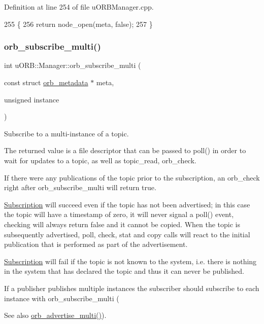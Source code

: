 Definition at line 254 of file u\+O\+R\+B\+Manager.\+cpp.


\begin{DoxyCode}
255 \{
256     \textcolor{keywordflow}{return} node\_open(meta, \textcolor{keyword}{false});
257 \}
\end{DoxyCode}
\mbox{\label{classuORB_1_1Manager_a9a31fb71a0962db44450963559296cfe}} 
\subsubsection{\texorpdfstring{orb\+\_\+subscribe\+\_\+multi()}{orb\_subscribe\_multi()}}
{\footnotesize\ttfamily int u\+O\+R\+B\+::\+Manager\+::orb\+\_\+subscribe\+\_\+multi (\begin{DoxyParamCaption}\item[{const struct \hyperlink{structorb__metadata}{orb\+\_\+metadata} $\ast$}]{meta,  }\item[{unsigned}]{instance }\end{DoxyParamCaption})}

Subscribe to a multi-\/instance of a topic.

The returned value is a file descriptor that can be passed to poll() in order to wait for updates to a topic, as well as topic\+\_\+read, orb\+\_\+check.

If there were any publications of the topic prior to the subscription, an orb\+\_\+check right after orb\+\_\+subscribe\+\_\+multi will return true.

\hyperlink{classuORB_1_1Subscription}{Subscription} will succeed even if the topic has not been advertised; in this case the topic will have a timestamp of zero, it will never signal a poll() event, checking will always return false and it cannot be copied. When the topic is subsequently advertised, poll, check, stat and copy calls will react to the initial publication that is performed as part of the advertisement.

\hyperlink{classuORB_1_1Subscription}{Subscription} will fail if the topic is not known to the system, i.\+e. there is nothing in the system that has declared the topic and thus it can never be published.

If a publisher publishes multiple instances the subscriber should subscribe to each instance with orb\+\_\+subscribe\+\_\+multi (\begin{DoxySeeAlso}{See also}
\hyperlink{classuORB_1_1Manager_a808104f7ebeab8f0d548dd9127344b24}{orb\+\_\+advertise\+\_\+multi()}).
\end{DoxySeeAlso}

